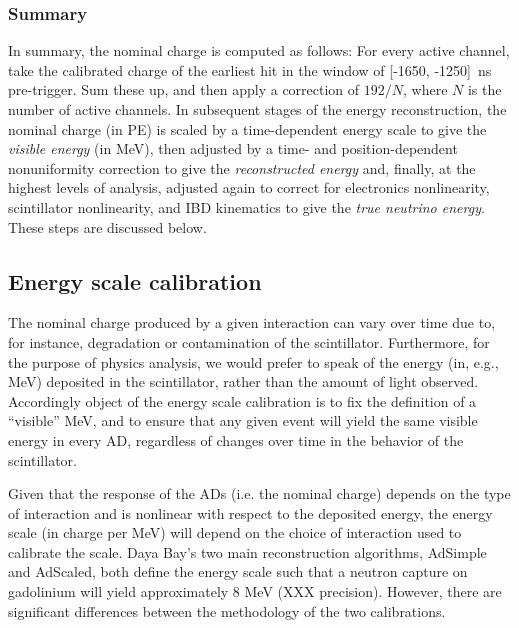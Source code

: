 \documentclass[../thesis.tex]{subfiles}
\begin{document}
\subsubsection{Summary}
\label{sec:reconChargeSummary}

In summary, the nominal charge is computed as follows: For every active channel,
take the calibrated charge of the earliest hit in the window of [-1650,
-1250]~ns pre-trigger. Sum these up, and then apply a correction of $192/N$,
where $N$ is the number of active channels. In subsequent stages of the energy
reconstruction, the nominal charge (in PE) is scaled by a time-dependent energy
scale to give the \emph{visible energy} (in MeV), then adjusted by a time- and
position-dependent nonuniformity correction to give the \emph{reconstructed
  energy} and, finally, at the highest levels of analysis, adjusted again to
correct for electronics nonlinearity, scintillator nonlinearity, and IBD
kinematics to give the \emph{true neutrino energy}. These steps are discussed
below.

\subsection{Energy scale calibration}
\label{sec:reconEnergyScale}

The nominal charge produced by a given interaction can vary over time due to,
for instance, degradation or contamination of the scintillator. Furthermore, for
the purpose of physics analysis, we would prefer to speak of the energy (in,
e.g., MeV) deposited in the scintillator, rather than the amount of light
observed. Accordingly object of the energy scale calibration is to fix the
definition of a ``visible'' MeV, and to ensure that any given event will yield
the same visible energy in every AD, regardless of changes over time in the
behavior of the scintillator.

Given that the response of the ADs (i.e. the nominal charge) depends on the type
of interaction and is nonlinear with respect to the deposited energy, the energy
scale (in charge per MeV) will depend on the choice of interaction used to
calibrate the scale. Daya Bay's two main reconstruction algorithms, AdSimple and
AdScaled, both define the energy scale such that a neutron capture on gadolinium
will yield approximately 8 MeV (XXX precision). However, there are significant
differences between the methodology of the two calibrations.
\end{document}
